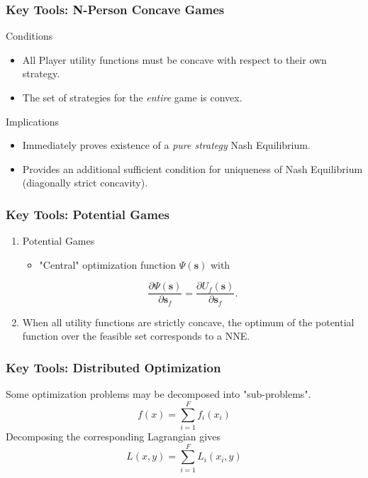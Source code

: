 \documentclass[10pt,tgadventor, onlymath]{beamer}
\begin{document}
\begin{frame}
\frametitle{Key Tools: N-Person Concave Games}
Conditions
\begin{itemize}
\item All Player utility functions must be concave with respect to their own strategy.
\item The set of strategies for the \emph{entire} game is convex. 
\end{itemize}
\bigskip
Implications
\begin{itemize}
\item Immediately proves existence of a \emph{pure strategy} Nash Equilibrium.
\item Provides an additional sufficient condition for uniqueness of Nash Equilibrium (diagonally strict concavity).
\end{itemize}
\end{frame}


\begin{frame}
\frametitle{Key Tools: Potential Games}
\begin{enumerate}
\item 
Potential Games
\begin{itemize}
\item "Central" optimization function $\Psi(\mathbf{s})$ with
\end{itemize}
\begin{equation}\label{potential_game_condition}
\frac{\partial \Psi(\mathbf{s})}{\partial \mathbf{s}_{f}}
 =
 \frac{\partial U_f(\mathbf{s})}{\partial \mathbf{s}_{f}}.
\end{equation} 
\item 
When all utility functions are strictly concave, the optimum of the potential function over the feasible set corresponds to a NNE.
\end{enumerate}
\end{frame}

\begin{frame}
\frametitle{Key Tools: Distributed Optimization}
Some optimization problems may be decomposed into "sub-problems".
\begin{equation}
f(x) = \sum_{i = 1}^{F} f_{i}(x_{i})
\end{equation}
Decomposing the corresponding Lagrangian gives
\begin{equation}
L(x,y) = \sum_{i = 1}^{F} L_i(x_i,y)
\end{equation}
\end{frame}
%
\end{document}
